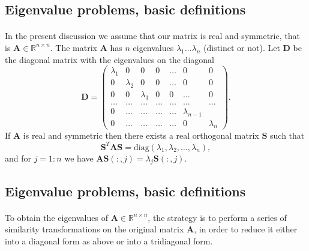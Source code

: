 \documentclass[%
oneside,                 %
final,                   %
10pt]{article}
\begin{document}
\subsection*{Eigenvalue problems, basic definitions}

\paragraph{}
In the present discussion we assume that our matrix is real and symmetric, that is 
$\mathbf{A}\in {\mathbb{R}}^{n\times n}$.
The matrix $\mathbf{A}$ has $n$ eigenvalues
$\lambda_1\dots \lambda_n$ (distinct or not). Let $\mathbf{D}$ be the
diagonal matrix with the eigenvalues on the diagonal
\[
\mathbf{D}=    \left( \begin{array}{ccccccc} \lambda_1 & 0 & 0   & 0    & \dots  &0     & 0 \\
                                0 & \lambda_2 & 0 & 0    & \dots  &0     &0 \\
                                0   & 0 & \lambda_3 & 0  &0       &\dots & 0\\
                                \dots  & \dots & \dots & \dots  &\dots      &\dots & \dots\\
                                0   & \dots & \dots & \dots  &\dots       &\lambda_{n-1} & \\
                                0   & \dots & \dots & \dots  &\dots       &0 & \lambda_n
             \end{array} \right).
\]
If $\mathbf{A}$ is real and symmetric then there exists a real orthogonal matrix $\mathbf{S}$ such that
\[
     \mathbf{S}^T \mathbf{A}\mathbf{S}= \mathrm{diag}(\lambda_1,\lambda_2,\dots ,\lambda_n),
\]
and for $j=1:n$ we have $\mathbf{A}\mathbf{S}(:,j) = \lambda_j \mathbf{S}(:,j)$.



\subsection*{Eigenvalue problems, basic definitions}

\paragraph{}
To obtain the eigenvalues of $\mathbf{A}\in {\mathbb{R}}^{n\times n}$,
the strategy is to
perform a series of similarity transformations on the original
matrix $\mathbf{A}$, in order to reduce it either into a  diagonal form as above
or into a  tridiagonal form. 
\end{document}
